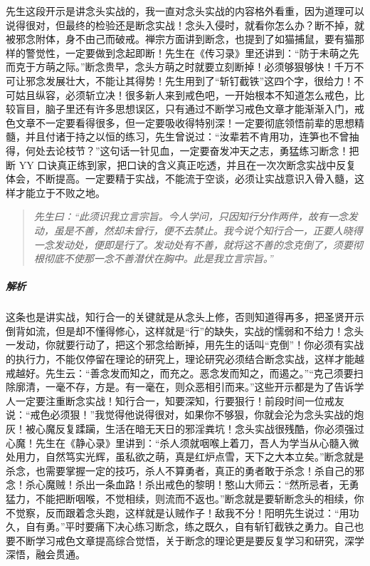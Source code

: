 先生这段开示是讲念头实战的，我一直对念头实战的内容格外看重，因为道理可以说得很对，但最终的检验还是断念实战！念头入侵时，就看你怎么办？断不掉，就被邪念附体，身不由己而破戒。禅宗方面讲到断念，也提到了如猫捕鼠，要有猫那样的警觉性，一定要做到念起即断！先生在《传习录》里还讲到：“防于未萌之先而克于方萌之际。”断念贵早，念头方萌之时就要立刻断掉！必须够狠够快！千万不可让邪念发展壮大，不能让其得势！先生用到了“斩钉截铁”这四个字，很给力！不可姑且纵容，必须斩立决！很多新人来到戒色吧，一开始根本不知道怎么戒色，比较盲目，脑子里还有许多思想误区，只有通过不断学习戒色文章才能渐渐入门，戒色文章不一定要看得很多，但一定要吸收得特别深！一定要彻底领悟前辈的思想精髓，并且付诸于持之以恒的练习，先生曾说过：“汝辈若不肯用功，连笋也不曾抽得，何处去论枝节？”这句话一针见血，一定要奋发冲天之志，勇猛练习断念！把断 YY 口诀真正练到家，把口诀的含义真正吃透，并且在一次次断念实战中反复体会，不断提高。一定要精于实战，不能流于空谈，必须让实战意识入骨入髓，这样才能立于不败之地。

\begin{quote}\it
    先生曰：“此须识我立言宗旨。今人学问，只因知行分作两件，故有一念发动，虽是不善，然却未曾行，便不去禁止。我今说个知行合一，正要人晓得一念发动处，便即是行了。发动处有不善，就将这不善的念克倒了，须要彻根彻底不使那一念不善潜伏在胸中。此是我立言宗旨。”
\end{quote}

\subparagraph{解析}

这条也是讲实战，知行合一的关键就是从念头上修，否则知道得再多，把圣贤开示倒背如流，但是却不懂得修心，这样就是“行”的缺失，实战的懦弱和不给力！念头一发动，你就要行动了，把这个邪念给断掉，用先生的话叫“克倒”！你必须有实战的执行力，不能仅停留在理论的研究上，理论研究必须结合断念实战，这样才能越戒越好。先生云：“善念发而知之，而充之。恶念发而知之，而遏之。”“克己须要扫除廓清，一毫不存，方是。有一毫在，则众恶相引而来。”这些开示都是为了告诉学人一定要注重断念实战！知行合一，知要深知，行要狠行！前段时间一位戒友说：“戒色必须狠！”我觉得他说得很对，如果你不够狠，你就会沦为念头实战的炮灰！被心魔反复蹂躏，生活在暗无天日的邪淫粪坑！念头实战很残酷，你必须强过心魔！先生在《静心录》里讲到：“杀人须就咽喉上着刀，吾人为学当从心髓入微处用力，自然笃实光辉，虽私欲之萌，真是红炉点雪，天下之大本立矣。”断念就是杀念，也需要掌握一定的技巧，杀人不算勇者，真正的勇者敢于杀念！杀自己的邪念！杀心魔贼！杀出一条血路！杀出戒色的黎明！憨山大师云：“然所忌者，无勇猛力，不能把断咽喉，不觉相续，则流而不返也。”断念就是要斩断念头的相续，你不觉察，反而跟着念头跑，这样就是认贼作子！敌我不分！阳明先生说过：“用功久，自有勇。”平时要痛下决心练习断念，练之既久，自有斩钉截铁之勇力。自己也要不断学习戒色文章提高综合觉悟，关于断念的理论更是要反复学习和研究，深学深悟，融会贯通。

